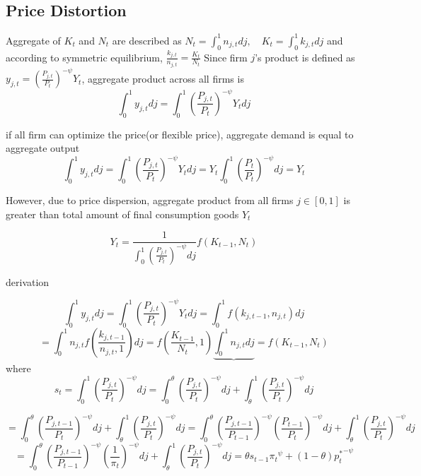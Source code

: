\documentclass[11pt, a4paper]{article}
\begin{document}
\subsection{Price Distortion}
\normalsize

Aggregate of $K_t$ and $N_t$ are described as
$
N_t = \int_0^1 n_{j,t} dj,   \quad K_t = \int_0^1 k_{j,t} dj
$
  and according to symmetric equilibrium,
 $\frac{k_{j,t}}{n_{j,t}} = \frac{K_t}{N_t}$
 Since firm $j$'s product is defined as $y_{j,t} = \left(\frac{P_{j,t}}{P_t} \right)^{-\psi} Y_t$, aggregate product across all firms is 
 \begin{displaymath}
\int_0^1 y_{j,t} dj = \int_0^1 \left(\frac{P_{j,t}}{P_t} \right)^{-\psi} Y_t dj 
\end{displaymath}

if all firm can optimize the price(or flexible price), aggregate demand is equal to aggregate output\\
\begin{displaymath} 
\int_0^1 y_{j,t} dj = \int_0^1 \left(\frac{P_{j,t}}{P_t} \right)^{-\psi} Y_t dj = Y_t \int_0^1 \left(\frac{P_{t}}{P_t} \right)^{-\psi} dj = Y_t \end{displaymath}


 However, due to price dispersion, aggregate product from all firms $j \in [0,1]$ is greater than total amount of final consumption goods $Y_t$

\begin{displaymath} Y_t = \frac{1}{
\int_0^1 \left(\frac{P_{j,t}}{P_t} \right)^{-\psi} dj } f(K_{t-1}, N_t)
\end{displaymath}

derivation

 \begin{displaymath}
\int_0^1 y_{j,t} dj = \int_0^1 \left(\frac{P_{j,t}}{P_t} \right)^{-\psi} Y_t dj = \int_0^1 f(k_{j,t-1}, n_{j,t}) dj 
\end{displaymath}
\begin{displaymath}
= \int_0^1 n_{j,t} f \left(\frac{k_{j,t-1}}{n_{j,t}, 1} \right) dj = f \left(\frac{K_{t-1}}{N_{t}}, 1 \right) \underbrace{\int_0^1 n_{j,t}  dj}  = f(K_{t-1}, N_t) 
\end{displaymath}
where \[
s_t = \int_0^1 \left(\frac{P_{j,t}}{P_t} \right)^{-\psi} dj = \int_0^\theta \left(\frac{P_{j,t}}{P_t} \right)^{-\psi} dj + \int_\theta^1 \left(\frac{P_{j,t}}{P_t} \right)^{-\psi} dj 
\]

\[
= \int_0^\theta \left(\frac{P_{j,t-1}}{P_t} \right)^{-\psi} dj + \int_\theta^1 \left(\frac{P_{j,t}}{P_t} \right)^{-\psi} dj = \int_0^\theta \left(\frac{P_{j,t-1}}{P_{t-1}} \right)^{-\psi} \left(\frac{P_{t-1}}{P_{t}} \right)^{-\psi} dj + \int_\theta^1 \left(\frac{P_{j,t}}{P_t} \right)^{-\psi} dj 
\]
\[
= \int_0^\theta \left(\frac{P_{j,t-1}}{P_{t-1}} \right)^{-\psi} \left(\frac{1}{\pi_{t}} \right)^{-\psi} dj + \int_\theta^1 \left(\frac{P_{j,t}}{P_t} \right)^{-\psi} dj 
= \theta s_{t-1} {\pi_{t}}^{\psi}  + (1-\theta) {p_{t}^*} ^{-\psi} \]
\end{document}
